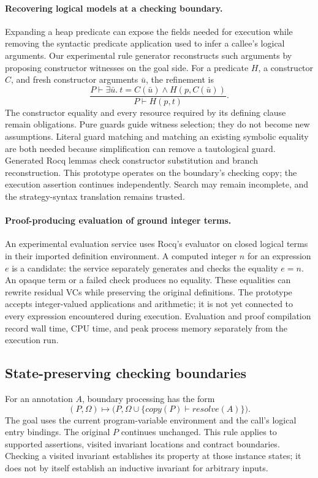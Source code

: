 \paragraph{Recovering logical models at a checking boundary.}
Expanding a heap predicate can expose the fields needed for execution while
removing the syntactic predicate application used to infer a callee's logical
arguments. Our experimental rule generator reconstructs such arguments by
proposing constructor witnesses on the goal side. For a predicate $H$, a
constructor $C$, and fresh constructor arguments $\bar u$, the refinement is
\[
\frac{P \vdash \exists\bar u.\ t=C(\bar u) \land H(p,C(\bar u))}
     {P \vdash H(p,t)}.
\]
The constructor equality and every resource required by its defining clause
remain obligations. Pure guards guide witness selection; they do not become
new assumptions. Literal guard matching and matching an existing symbolic
equality are both needed because simplification can remove a tautological
guard. Generated Rocq lemmas check constructor substitution and branch
reconstruction. This prototype operates on the boundary's checking copy;
the execution assertion continues independently. Search may remain incomplete,
and the strategy-syntax translation remains trusted.

\paragraph{Proof-producing evaluation of ground integer terms.}
An experimental evaluation service uses Rocq's evaluator on closed logical
terms in their imported definition environment. A computed integer $n$ for
an expression $e$ is a candidate: the service separately generates and checks
the equality $e=n$. An opaque term or a failed check produces no equality.
These equalities can rewrite residual VCs while preserving the original
definitions. The prototype accepts integer-valued applications and arithmetic;
it is not yet connected to every expression encountered during execution.
Evaluation and proof compilation record wall time, CPU time, and peak process
memory separately from the execution run.

\subsection{State-preserving checking boundaries}

For an annotation $A$, boundary processing has the form
\[
  (P,\Omega) \longmapsto
  \bigl(P,\Omega \cup \{\mathit{copy}(P)\vdash\mathit{resolve}(A)\}\bigr).
\]
The goal uses the current program-variable environment and the call's logical
entry bindings. The original $P$ continues unchanged. This rule applies to
supported assertions, visited invariant locations and contract boundaries.
Checking a visited invariant establishes its property at those instance states;
it does not by itself establish an inductive invariant for arbitrary inputs.

